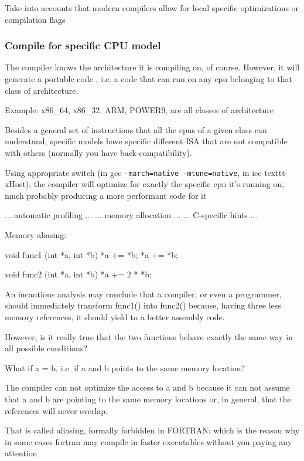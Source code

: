 Take into accounts that modern compilers allow for local specific optimizations or compilation flags

\subsubsection{Compile for specific CPU model}

The compiler knows the architecture it is compiling on, of course. However, it will generate a portable code , i.e. a code that can run on any cpu belonging to that class of architecture.

Example: x86\_64, x86\_32, ARM, POWER9, are all classes of architecture

Besides a general set of instructions that all the cpus of a given class can understand, specific models have specific different ISA that are not compatible with others (normally you have back-compatibility).

Using appropriate switch (in gcc \texttt{-march=native -mtune=native}, in icc texttt{-xHost}), the compiler will optimize for exactly the specific cpu it’s running on, much probably producing a more performant code for it

... automatic profiling ... 
... memory allocation ... 
... C-specific hints ...

Memory aliasing:

\begin{codeblock}[language = C]
void func1 (int *a, int *b)  {
    *a += *b;
    *a += *b;
}

void func2 (int *a, int *b)  {
    *a += 2 * *b;
}
\end{codeblock}

An incautious analysis may conclude that a compiler, or even a programmer, should immediately transform func1() into func2() because, having three less memory references, it should yield to a better assembly code.

However, is it really true that the two functions behave exactly the same way in all possible conditions?

What if a = b, i.e. if a and b points to the same memory location?

The compiler can not optimize the access to a and b because it can not assume that a and b are pointing to the same memory locations or, in general, that the references will never overlap.

That is called aliasing, formally forbidden in FORTRAN: which is the reason why in some cases fortran may compile in faster executables without you paying any attention

